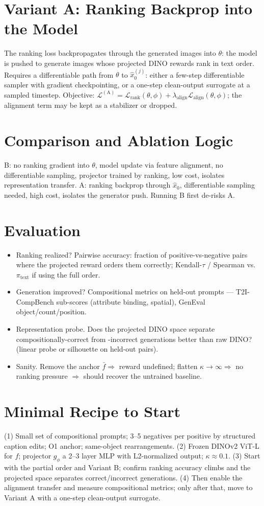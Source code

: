 \documentclass[11pt]{article}
\begin{document}
\section{Variant A: Ranking Backprop into the Model}
The ranking loss backpropagates through the generated images into $\theta$: the model is pushed to generate images whose projected DINO rewards rank in text order. Requires a differentiable path from $\theta$ to $\hat{x}_0^{(j)}$: either a few-step differentiable sampler with gradient checkpointing, or a one-step clean-output surrogate at a sampled timestep.
Objective: $\mathcal{L}^{(\text{A})} = \mathcal{L}_{\text{rank}}(\theta, \phi) + \lambda_{\text{align}} \mathcal{L}_{\text{align}}(\theta, \phi)$; the alignment term may be kept as a stabilizer or dropped.

\section{Comparison and Ablation Logic}
B: no ranking gradient into $\theta$, model update via feature alignment, no differentiable sampling, projector trained by ranking, low cost, isolates representation transfer. A: ranking backprop through $\hat{x}_0$, differentiable sampling needed, high cost, isolates the generator push. Running B first de-risks A.

\section{Evaluation}
\begin{itemize}
\item Ranking realized? Pairwise accuracy: fraction of positive-vs-negative pairs where the projected reward orders them correctly; Kendall-$\tau$ / Spearman vs.\ $\pi_{\text{text}}$ if using the full order.
\item Generation improved? Compositional metrics on held-out prompts --- T2I-CompBench sub-scores (attribute binding, spatial), GenEval object/count/position.
\item Representation probe. Does the projected DINO space separate compositionally-correct from -incorrect generations better than raw DINO? (linear probe or silhouette on held-out pairs).
\item Sanity. Remove the anchor $\bar{f} \Rightarrow$ reward undefined; flatten $\kappa \to \infty \Rightarrow$ no ranking pressure $\Rightarrow$ should recover the untrained baseline.
\end{itemize}

\section{Minimal Recipe to Start}
(1) Small set of compositional prompts; 3--5 negatives per positive by structured caption edits; O1 anchor; same-object rearrangements. (2) Frozen DINOv2 ViT-L for $f$; projector $g_\phi$ a 2--3 layer MLP with L2-normalized output; $\kappa \approx 0.1$. (3) Start with the partial order and Variant B; confirm ranking accuracy climbs and the projected space separates correct/incorrect generations. (4) Then enable the alignment transfer and measure compositional metrics; only after that, move to Variant A with a one-step clean-output surrogate.
\end{document}
